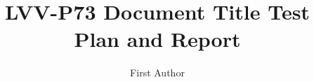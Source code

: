 \documentclass[DM,lsstdraft,toc]{lsstdoc}
\begin{document}
\def\milestoneName{Document Title}
\def\milestoneId{LVV-P73}
\def\product{Data Management}


\title{LVV-P73 Document Title Test Plan and Report}
\setDocRef{\lsstDocType-\lsstDocNum}
\date{\vcsDate}
\author{First Author}



\end{document}
